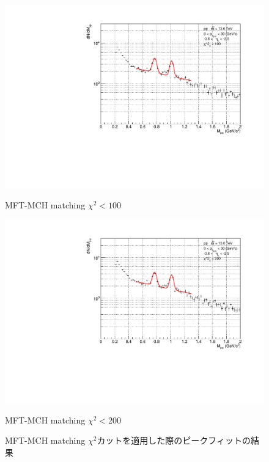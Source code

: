\begin{figure}[H]
\begin{minipage}{0.45\textwidth}
                \end{minipage}
                \\
                \vspace{1em}
                \begin{minipage}{0.45\textwidth}
                    \centering
                    \includegraphics[width=\textwidth]{fig/3_4_4_Fit_chi2_100.pdf}
                    \caption*{MFT-MCH matching $\chi^2 < 100$}
                \end{minipage}
                \hfill
                \begin{minipage}{0.45\textwidth}
                    \centering
                    \includegraphics[width=\textwidth]{fig/3_4_4_Fit_chi2_200.pdf}
                    \caption*{MFT-MCH matching $\chi^2 < 200$}
                \end{minipage}
                \caption{MFT-MCH matching $\chi^2$カットを適用した際のピークフィットの結果}
                \label{Analysis:Dimuon:Matching_Fit}
            \end{figure}
